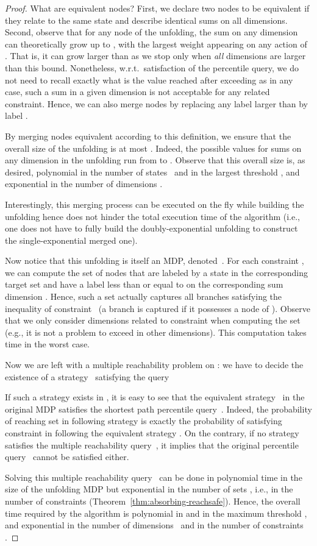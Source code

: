 \documentclass{llncs}
\begin{document}
\begin{proof}
What are equivalent nodes? First, we declare two nodes to be equivalent if they relate to the same state and describe identical sums on all dimensions. Second, observe that for any node of the unfolding, the sum on any dimension can theoretically grow up to , with  the largest weight appearing on any action of . That is, it can grow larger than  as we stop only when \textit{all} dimensions are larger than this bound. Nonetheless, w.r.t.~satisfaction of the percentile query, we do not need to recall exactly what is the value reached after exceeding  as in any case, such a sum in a given dimension is not acceptable for any related constraint. Hence, we can also merge nodes by replacing any label larger than  by label .

By merging nodes equivalent according to this definition, we ensure that the overall size of the unfolding is at most . Indeed, the possible values for sums on any dimension in the unfolding run from  to . Observe that this overall size  is, as desired, polynomial in the number of states~ and in the largest threshold , and exponential in the number of dimensions .

Interestingly, this merging process can be executed on the fly while building the unfolding hence does not hinder the total execution time of the algorithm (i.e., one does not have to fully build the doubly-exponential unfolding to construct the single-exponential merged one).

Now notice that this unfolding is itself an MDP, denoted~. For each constraint , we can compute the set  of nodes that are labeled by a state in the corresponding target set  and have a label less than or equal to  on the corresponding sum dimension . Hence, such a set  actually captures all branches satisfying the inequality of constraint~ (a branch is captured if it possesses a node of ). Observe that we only consider dimensions related to constraint  when computing the set~ (e.g., it is not a problem to exceed  in other dimensions). This computation takes time  in the worst case.

Now we are left with a multiple reachability problem on : we have to decide the existence of a strategy~ satisfying the query

If such a strategy  exists in , it is easy to see that the equivalent strategy~ in the original MDP  satisfies the shortest path percentile query~. Indeed, the probability of reaching set  in  following strategy  is exactly the probability of satisfying constraint  in  following the equivalent strategy . On the contrary, if no strategy satisfies the multiple reachability query~, it implies that the original percentile query~ cannot be satisfied either.

Solving this multiple reachability query~ can be done in polynomial time in the size of the unfolding MDP  but exponential in the number of sets , i.e., in the number of constraints (Theorem~\ref{thm:absorbing-reachsafe}). Hence, the overall time required by the algorithm is polynomial in  and in the maximum threshold , and exponential in the number of dimensions~ and in the number of constraints .
\end{proof}
\end{document}
